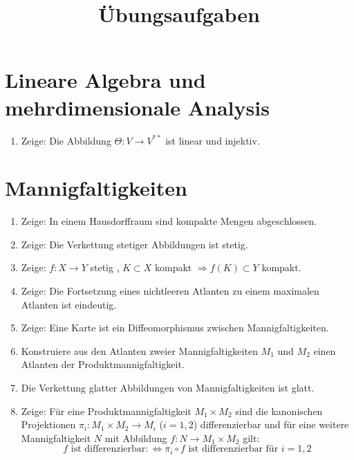\documentclass[a4paper]{scrartcl}
\title{Übungsaufgaben}
\begin{document}
	\maketitle
\setcounter{section}{-1}
	\section{Lineare Algebra und mehrdimensionale Analysis}
	\begin{enumerate}
		\item Zeige: Die Abbildung $\Theta\colon V\rightarrow V^{**}$ ist linear und injektiv.
	\end{enumerate}
	\section{Mannigfaltigkeiten}
	\begin{enumerate}
		\item Zeige: In einem Hausdorffraum sind kompakte Mengen abgeschlossen.
		\item Zeige: Die Verkettung stetiger Abbildungen ist stetig.
		\item Zeige: $f\colon X\rightarrow Y$ stetig , $K\subset X$ kompakt $\Rightarrow f(K)\subset Y$ kompakt.
		\item Zeige: Die Fortsetzung eines nichtleeren Atlanten zu einem maximalen Atlanten ist eindeutig.
		\item Zeige: Eine Karte ist ein Diffeomorphismus zwischen Mannigfaltigkeiten.
		\item Konstruiere aus den Atlanten zweier Mannigfaltigkeiten $M_1$ und $M_2$ einen Atlanten der Produktmannigfaltigkeit.
		\item Die Verkettung glatter Abbildungen von Mannigfaltigkeiten ist glatt.
		\item Zeige: Für eine Produktmannigfaltigkeit $M_1\times M_2$ sind die kanonischen Projektionen $\pi_i\colon M_1\times M_2\rightarrow M_i$ ($i=1,2$) differenzierbar und für eine weitere Mannigfaltigkeit $N$ mit Abbildung $f\colon N\rightarrow M_1\times M_2$ gilt:
		\begin{equation}
			\text{$f$ ist differenzierbar} \colon\Leftrightarrow \pi_i\circ f \text{ ist differenzierbar für } i=1,2
		\end{equation}
	\end{enumerate}
\end{document}
